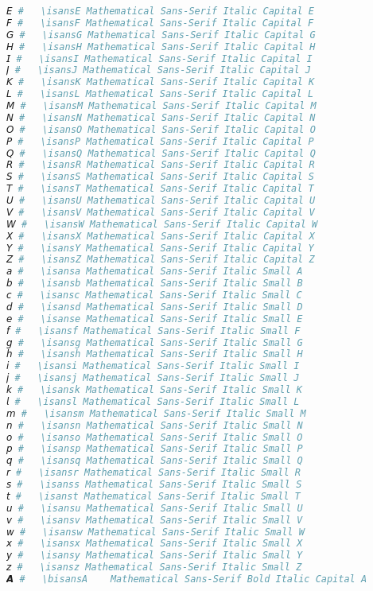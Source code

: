 \begin{lstlisting}[language=Julia, style=julia]
𝘌 #   \isansE Mathematical Sans-Serif Italic Capital E
𝘍 #   \isansF Mathematical Sans-Serif Italic Capital F
𝘎 #   \isansG Mathematical Sans-Serif Italic Capital G
𝘏 #   \isansH Mathematical Sans-Serif Italic Capital H
𝘐 #   \isansI Mathematical Sans-Serif Italic Capital I
𝘑 #   \isansJ Mathematical Sans-Serif Italic Capital J
𝘒 #   \isansK Mathematical Sans-Serif Italic Capital K
𝘓 #   \isansL Mathematical Sans-Serif Italic Capital L
𝘔 #   \isansM Mathematical Sans-Serif Italic Capital M
𝘕 #   \isansN Mathematical Sans-Serif Italic Capital N
𝘖 #   \isansO Mathematical Sans-Serif Italic Capital O
𝘗 #   \isansP Mathematical Sans-Serif Italic Capital P
𝘘 #   \isansQ Mathematical Sans-Serif Italic Capital Q
𝘙 #   \isansR Mathematical Sans-Serif Italic Capital R
𝘚 #   \isansS Mathematical Sans-Serif Italic Capital S
𝘛 #   \isansT Mathematical Sans-Serif Italic Capital T
𝘜 #   \isansU Mathematical Sans-Serif Italic Capital U
𝘝 #   \isansV Mathematical Sans-Serif Italic Capital V
𝘞 #   \isansW Mathematical Sans-Serif Italic Capital W
𝘟 #   \isansX Mathematical Sans-Serif Italic Capital X
𝘠 #   \isansY Mathematical Sans-Serif Italic Capital Y
𝘡 #   \isansZ Mathematical Sans-Serif Italic Capital Z
𝘢 #   \isansa Mathematical Sans-Serif Italic Small A
𝘣 #   \isansb Mathematical Sans-Serif Italic Small B
𝘤 #   \isansc Mathematical Sans-Serif Italic Small C
𝘥 #   \isansd Mathematical Sans-Serif Italic Small D
𝘦 #   \isanse Mathematical Sans-Serif Italic Small E
𝘧 #   \isansf Mathematical Sans-Serif Italic Small F
𝘨 #   \isansg Mathematical Sans-Serif Italic Small G
𝘩 #   \isansh Mathematical Sans-Serif Italic Small H
𝘪 #   \isansi Mathematical Sans-Serif Italic Small I
𝘫 #   \isansj Mathematical Sans-Serif Italic Small J
𝘬 #   \isansk Mathematical Sans-Serif Italic Small K
𝘭 #   \isansl Mathematical Sans-Serif Italic Small L
𝘮 #   \isansm Mathematical Sans-Serif Italic Small M
𝘯 #   \isansn Mathematical Sans-Serif Italic Small N
𝘰 #   \isanso Mathematical Sans-Serif Italic Small O
𝘱 #   \isansp Mathematical Sans-Serif Italic Small P
𝘲 #   \isansq Mathematical Sans-Serif Italic Small Q
𝘳 #   \isansr Mathematical Sans-Serif Italic Small R
𝘴 #   \isanss Mathematical Sans-Serif Italic Small S
𝘵 #   \isanst Mathematical Sans-Serif Italic Small T
𝘶 #   \isansu Mathematical Sans-Serif Italic Small U
𝘷 #   \isansv Mathematical Sans-Serif Italic Small V
𝘸 #   \isansw Mathematical Sans-Serif Italic Small W
𝘹 #   \isansx Mathematical Sans-Serif Italic Small X
𝘺 #   \isansy Mathematical Sans-Serif Italic Small Y
𝘻 #   \isansz Mathematical Sans-Serif Italic Small Z
𝘼 #   \bisansA    Mathematical Sans-Serif Bold Italic Capital A

\end{lstlisting}
